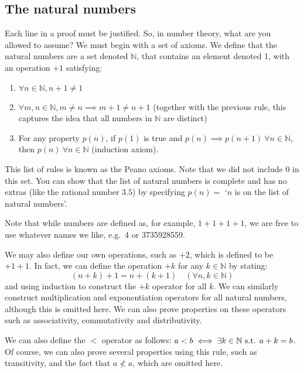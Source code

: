 \subsection{The natural numbers}
Each line in a proof must be justified.
So, in number theory, what are you allowed to assume?
We must begin with a set of axioms.
We define that the natural numbers are a set denoted \(\mathbb N\), that contains an element denoted 1, with an operation \(+1\) satisfying:
\begin{enumerate}
	\item \(\forall n \in \mathbb N, n + 1 \neq 1\)
	\item \(\forall m,n \in \mathbb N, m \neq n \implies m+1 \neq n+1\) (together with the previous rule, this captures the idea that all numbers in \(\mathbb N\) are distinct)
	\item For any property \(p(n)\), if \(p(1)\) is true and \(p(n) \implies p(n+1) \ \forall n \in \mathbb N\), then \(p(n) \ \forall n \in \mathbb N\) (induction axiom).
\end{enumerate}

This list of rules is known as the Peano axioms.
Note that we did not include 0 in this set.
You can show that the list of natural numbers is complete and has no extras (like the rational number \(3.5\)) by specifying \(p(n)=\) `\(n\) is on the list of natural numbers'.

Note that while numbers are defined as, for example, \(1+1+1+1\), we are free to use whatever names we like, e.g.\ 4 or 3735928559.

We may also define our own operations, such as \(+2\), which is defined to be \(+1+1\).
In fact, we can define the operation \(+k\) for any \(k \in \mathbb N\) by stating:
\[
	(n+k)+1 = n+(k+1) \quad(\forall n, k \in \mathbb N)
\]
and using induction to construct the \(+k\) operator for all \(k\).
We can similarly construct multiplication and exponentiation operators for all natural numbers, although this is omitted here.
We can also prove properties on these operators such as associativity, commutativity and distributivity.

We can also define the \(<\) operator as follows: \(a < b \iff \exists k \in \mathbb N \text{ s.t. } a + k = b\).
Of course, we can also prove several properties using this rule, such as transitivity, and the fact that \(a \nless a\), which are omitted here.

